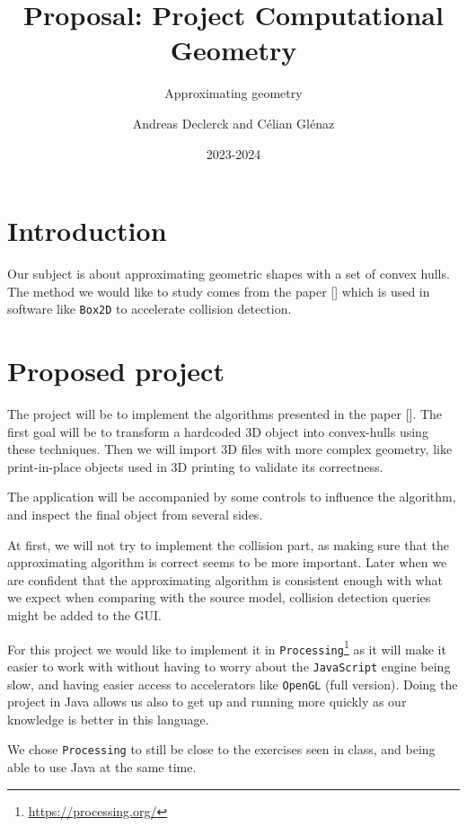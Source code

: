 \documentclass[]{article}
\title{Proposal: Project Computational Geometry}
\subtitle{Approximating geometry}
\author{Andreas Declerck and Célian Glénaz}
\date{2023-2024}
\begin{document}
\maketitle

\section{Introduction}

Our subject is about approximating geometric shapes with a set of convex hulls.
The method we would like to study comes from the paper
    [\cite{wei_approximate_2022}] which is used in software like \verb|Box2D|
to accelerate collision detection.

\section{Proposed project}

The project will be to implement the algorithms presented in the paper
    [\cite{wei_approximate_2022}].
The first goal will be to transform a hardcoded 3D object into convex-hulls
using these techniques.
Then we will import 3D files with more complex geometry, like print-in-place
objects used in 3D printing to validate its correctness.

The application will be accompanied by some controls to influence the algorithm,
and inspect the final object from several sides.

At first, we will not try to implement the collision part, as making sure that the
approximating algorithm is correct seems to be more important.
Later when we are confident that the approximating algorithm is consistent enough
with what we expect when comparing with the source model, collision detection
queries might be added to the GUI.

For this project we would like to implement it in
\verb|Processing|\footnote{\url{https://processing.org/}} as it will make it
easier to work with without having to worry about the \verb|JavaScript| engine
being slow, and having easier access to accelerators like \verb|OpenGL| (full
version).
Doing the project in Java allows us also to get up and running more quickly as
our knowledge is better in this language.

We chose \verb|Processing| to still be close to the exercises seen in class, and
being able to use Java at the same time.


\printbibliography
\end{document}
